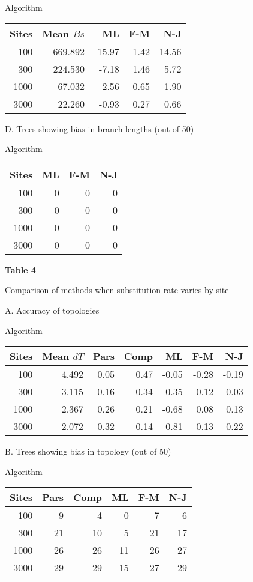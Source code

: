 \begin{flushleft}
\begin{center}
Algorithm

\begin{tabular}{| r | r | r r r |}
\hline
Sites & Mean $Bs$ & ML & F-M & N-J\\
\hline
100 & 669.892 & -15.97 & 1.42 & 14.56 \\
300 & 224.530 & -7.18 & 1.46 & 5.72 \\
1000 & 67.032 & -2.56 & 0.65 & 1.90 \\
3000 & 22.260 & -0.93 & 0.27 & 0.66 \\
\hline
\end{tabular}

\bigskip

D. Trees showing bias in branch lengths (out of 50)

Algorithm

\begin{tabular}{| r |  r r r |}
\hline
Sites  & ML & F-M & N-J\\
\hline
100  & 0 & 0 & 0\\
300  & 0 & 0 & 0\\
1000  & 0 & 0 & 0\\
3000  & 0 & 0 & 0\\
\hline
\end{tabular}
\end{center}
\newpage

{\bf Table 4

Comparison of methods when substitution rate varies by site}

\begin{center}
A.  Accuracy of topologies

Algorithm

\begin{tabular}{| r | r | r r r r r |}
\hline
Sites & Mean $dT$ & Pars & Comp & ML & F-M & N-J \\
\hline
100 & 4.492 & 0.05 & 0.47 & -0.05 & -0.28 & -0.19\\
300 & 3.115 & 0.16 & 0.34 & -0.35 & -0.12 & -0.03\\
1000 & 2.367 & 0.26 & 0.21 & -0.68 & 0.08  & 0.13\\
3000 & 2.072 & 0.32 & 0.14 & -0.81 & 0.13  & 0.22\\
\hline
\end{tabular}
\bigskip

B. Trees showing bias in topology (out of 50)

Algorithm

\begin{tabular}{| r | r r r r r |}
\hline
Sites  & Pars & Comp & ML & F-M  & N-J\\
\hline
100  & 9 & 4 & 0 & 7 & 6\\
300  & 21 & 10 & 5 & 21 & 17\\
1000  & 26 & 26 & 11 & 26 & 27\\
3000  & 29 & 29 & 15 & 27 & 29\\
\hline
\end{tabular}
\end{center}
\newpage


\end{flushleft}
